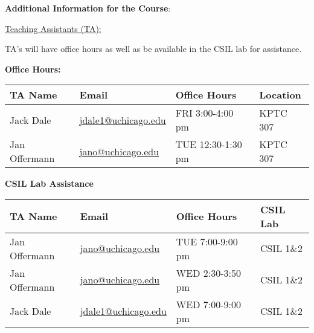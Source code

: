 \noindent \textbf {\Large \sc Additional Information for the Course}:

\vspace{1cm}

\noindent \underline{Teaching Assistants (TA):}

\noindent TA's will have office hours as well as be available in the CSIL lab for assistance.

\textbf{Office Hours:}

\begin{tabular}{l l | l | l }

TA Name & Email & Office Hours & Location \\ \hline

Jack Dale          & \href{mailto:jdale1@uchicago.edu}{jdale1@uchicago.edu}  & FRI  3:00-4:00 pm  & KPTC 307 \\
Jan Offermann      & \href{mailto:jano@uchicago.edu}{jano@uchicago.edu}      & TUE 12:30-1:30 pm  & KPTC 307 \\


\end{tabular}

\vspace{1cm}

\textbf{CSIL Lab Assistance}

\begin{tabular}{l l | l | l }

TA Name & Email & Office Hours & CSIL Lab \\ \hline

Jan Offermann          & \href{mailto:jano@uchicago.edu}{jano@uchicago.edu}  & TUE  7:00-9:00 pm  & CSIL 1\&2 \\
Jan Offermann      & \href{mailto:jano@uchicago.edu}{jano@uchicago.edu}      & WED  2:30-3:50 pm  & CSIL 1\&2 \\
Jack Dale     & \href{mailto:jdale1@uchicago.edu}{jdale1@uchicago.edu}     & WED  7:00-9:00 pm  & CSIL 1\&2 \\


\end{tabular}

\vspace{1cm}

